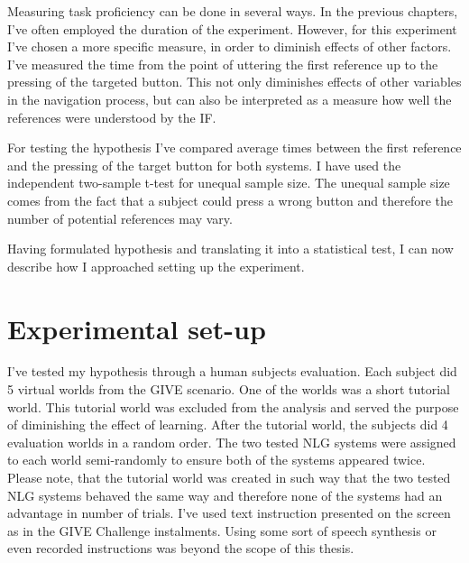 
Measuring task proficiency can be done in several ways. In the previous chapters, I've often employed the duration of the experiment. However, for this experiment I've chosen a more specific measure, in order to diminish effects of other factors. I've measured the time from the point of uttering the first reference up to the pressing of the targeted button. This not only diminishes effects of other variables in the navigation process, but can also be interpreted as a measure how well the references were understood by the IF.

For testing the hypothesis I've compared average times between the first reference and the pressing of the target button for both systems. I have used the independent two-sample t-test for unequal sample size. The unequal sample size comes from the fact that a subject could press a wrong button and therefore the number of potential references may vary.

Having formulated hypothesis and translating it into a statistical test, I can now describe how I approached setting up the experiment.

\section{Experimental set-up}
\label{sec:exper-setup}
I've tested my hypothesis through a human subjects evaluation. Each subject did 5 virtual worlds from the GIVE scenario. One of the worlds was a short tutorial world. This tutorial world was excluded from the analysis and served the purpose of diminishing the effect of learning. After the tutorial world, the subjects did 4 evaluation worlds in a random order. The two tested NLG systems were assigned to each world semi-randomly to ensure both of the systems appeared twice. Please note, that the tutorial world was created in such way that the two tested NLG systems behaved the same way and therefore none of the systems had an advantage in number of trials. I've used text instruction presented on the screen as in the GIVE Challenge instalments. Using some sort of speech synthesis or even recorded instructions was beyond the scope of this thesis.

